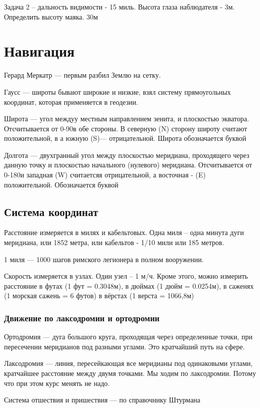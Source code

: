 \documentclass{article}        %
\begin{document}
Задача 2 -- дальность видимости - 15 миль. Высота глаза наблюдателя - 3м. Определить высоту маяка.  30м


\section{Навигация}
Герард Меркатр --- первым разбил Землю на сетку.

Гаусс --- широты бывают широкие и низкие, взял систему прямоугольных координат, которая применяется в геодезии.

Широта --- угол междуу местным направлением зенита, и плоскостью экватора. Отсчитывается от 0-90\degree в обе стороны. В северную (N) сторону широту считают положительной, в а южную (S)--- отрицательной. Широта обозначается буквой \phi

Долгота --- двухгранный угол между плоскостью меридиана, проходящего через данную точку и плоскостью начального (нулевого) меридиана. Отсчитывается от 0-180\degree и западная (W) считаетсяя отрицательной, а восточная - (E) положительной. Обозначается буквой \lambda

\subsection{Система координат}
Расстояние измеряется в милях и кабельтовых. 
Одна миля -- одна минута дуги меридиана, или 1852 метра, 
или кабельтов - 1/10 мили или 185 метров.

1 миля --- 1000 шагов римского легионера в полном вооружении.

Скорость измеряется в узлах. 
Один узел -- 1 м/ч. Кроме этого, можно измерить расстояние
в футах (1 фут = 0.3048м), 
в дюймах (1 дюйм = 0.0254м),
в саженях (1 морская сажень = 6 футов)
в вёрстах (1 верста = 1066,8м)

\subsubsection{Движение по лаксодромии и ортодромии}
Ортодромия --- дуга большого круга, проходящая через определенные точки, при пересечении меридианов под разными углами. Это кратчайший путь на сфере.

Лаксодромия --- линия, пересейкающая все меридианы под одинаковыми углами, кратчайшее расстояние между двумя точками. Мы ходим по лаксодромии. Потому что при этом курс менять не надо.

Система отшествия и пришествия --- по справочнику Штурмана
\end{document}
